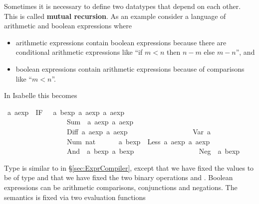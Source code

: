 %
\begin{isabellebody}%
%
\begin{isamarkuptext}%
Sometimes it is necessary to define two datatypes that depend on each
other. This is called \textbf{mutual recursion}. As an example consider a
language of arithmetic and boolean expressions where
\begin{itemize}
\item arithmetic expressions contain boolean expressions because there are
  conditional arithmetic expressions like ``if $m<n$ then $n-m$ else $m-n$'',
  and
\item boolean expressions contain arithmetic expressions because of
  comparisons like ``$m<n$''.
\end{itemize}
In Isabelle this becomes%
\end{isamarkuptext}%
\ {\isacharprime}a\ aexp\ {\isacharequal}\ IF\ \ \ {\isachardoublequote}{\isacharprime}a\ bexp{\isachardoublequote}\ {\isachardoublequote}{\isacharprime}a\ aexp{\isachardoublequote}\ {\isachardoublequote}{\isacharprime}a\ aexp{\isachardoublequote}\isanewline
\ \ \ \ \ \ \ \ \ \ \ \ \ \ \ \ \ {\isacharbar}\ Sum\ \ {\isachardoublequote}{\isacharprime}a\ aexp{\isachardoublequote}\ {\isachardoublequote}{\isacharprime}a\ aexp{\isachardoublequote}\isanewline
\ \ \ \ \ \ \ \ \ \ \ \ \ \ \ \ \ {\isacharbar}\ Diff\ {\isachardoublequote}{\isacharprime}a\ aexp{\isachardoublequote}\ {\isachardoublequote}{\isacharprime}a\ aexp{\isachardoublequote}\isanewline
\ \ \ \ \ \ \ \ \ \ \ \ \ \ \ \ \ {\isacharbar}\ Var\ {\isacharprime}a\isanewline
\ \ \ \ \ \ \ \ \ \ \ \ \ \ \ \ \ {\isacharbar}\ Num\ nat\isanewline
{}\ \ \ \ \ \ {\isacharprime}a\ bexp\ {\isacharequal}\ Less\ {\isachardoublequote}{\isacharprime}a\ aexp{\isachardoublequote}\ {\isachardoublequote}{\isacharprime}a\ aexp{\isachardoublequote}\isanewline
\ \ \ \ \ \ \ \ \ \ \ \ \ \ \ \ \ {\isacharbar}\ And\ \ {\isachardoublequote}{\isacharprime}a\ bexp{\isachardoublequote}\ {\isachardoublequote}{\isacharprime}a\ bexp{\isachardoublequote}\isanewline
\ \ \ \ \ \ \ \ \ \ \ \ \ \ \ \ \ {\isacharbar}\ Neg\ \ {\isachardoublequote}{\isacharprime}a\ bexp{\isachardoublequote}%
\begin{isamarkuptext}%
\noindent
Type  is similar to  in \S\ref{sec:ExprCompiler},
except that we have fixed the values to be of type  and that we
have fixed the two binary operations  and . Boolean
expressions can be arithmetic comparisons, conjunctions and negations.
The semantics is fixed via two evaluation functions%

\end{isamarkuptext}
\end{isabellebody}
